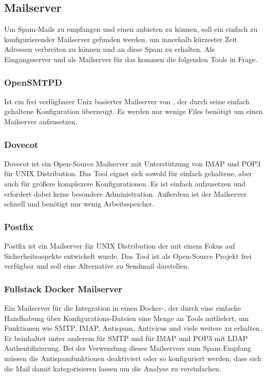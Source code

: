 \documentclass[a4paper,11pt,singlespacing]{article}
\begin{document}
	\subsection{Mailserver}\label{sec:Mailserver}
		Um Spam-Mails zu empfangen und einen  anbieten zu können, soll ein einfach zu konfigurierender Mailserver gefunden werden, um innerhalb kürzester Zeit Adressen verbreiten zu können und an diese Spam zu erhalten.
		Als Eingangsserver und als Mailserver für das  kommen die folgenden Tools in Frage. 
		\subsubsection{OpenSMTPD}\label{sec:OpenSMTPD}
			Ist ein frei verfügbarer Unix basierter Mailserver von , der durch seine einfach gehaltene Konfiguration überzeugt. Es werden nur wenige Files benötigt um einen Mailserver aufzusetzen.
		\subsubsection{Dovecot}\label{sec:Dovecot}
		Dovecot ist ein Open-Source Mailserver mit Unterstützung von IMAP und POP3 für UNIX Distribution. Das Tool eignet sich sowohl für einfach gehaltene, aber auch für größere komplexere Konfigurationen. Es ist einfach aufzusetzen und erfordert dabei keine besondere Administration. Außerdem ist der Mailserver schnell und benötigt nur wenig Arbeitsspeicher. \cite{dovecot}
		\subsubsection{Postfix}\label{sec:Postfix}
			Postfix ist ein Mailserver für UNIX Distribution der mit einem Fokus auf Sicherheitsaspekte entwickelt wurde. Das Tool ist als Open-Source Projekt frei verfügbar und soll eine Alternative zu Sendmail darstellen. \cite{postfix}
		\subsubsection{Fullstack Docker Mailserver}\label{sec:FullstackDockerMailserver}
			Ein Mailserver für die Integration in einen Docker-, der durch eine einfache Handhabung über Konfigurations-Dateien eine Menge an Tools mitliefert, um Funktionen wie SMTP, IMAP, Antispam, Antivirus und viele weitere zu erhalten. Er beinhaltet unter anderem  für SMTP und  für IMAP und  POP3 mit LDAP Authentifizierung. \cite{fullstackDockerMailserver} Bei der Verwendung dieses Mailservers zum Spam-Empfang müssen die Antispamfunktionen deaktiviert oder so konfiguriert werden, dass sich die Mail damit kategorisieren lassen um die Analyse zu vereinfachen.
\end{document}
